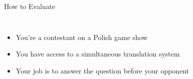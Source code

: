 \documentclass[compress]{beamer}
\begin{document}
\begin{frame}{How to Evaluate}

  \begin{columns}
    \begin{itemize}
    \item You're a contestant on a Polish game show
    \item You have access to a simultaneous translation system
    \item Your job is to answer the question before your opponent
    \end{itemize}
  \end{columns}

\end{frame}
\end{document}

